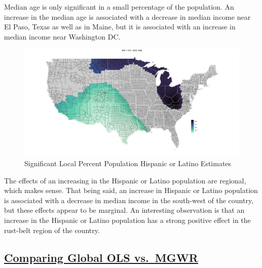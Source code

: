 \documentclass[
]{article}
\begin{document}
Median age is only significant in a small percentage of the population.
An increase in the median age is associated with a decrease in median
income near El Paso, Texas as well as in Maine, but it is associated
with an increase in median income near Washington DC.

\begin{figure}[H]

{\centering \includegraphics[width=1\linewidth]{images/local-param/sig-pct-hisplat} 

}

\caption{Significant Local Percent Population Hispanic or Latino Estimates}\label{fig:unnamed-chunk-19}
\end{figure}

The effects of an increasing in the Hispanic or Latino population are
regional, which makes sense. That being said, an increase in Hispanic or
Latino population is associated with a decrease in median income in the
south-west of the country, but these effects appear to be marginal. An
interesting observation is that an increase in the Hispanic or Latino
population has a strong positive effect in the rust-belt region of the
country.

\newpage

\subsection{\texorpdfstring{\ul{Comparing Global OLS
vs.~MGWR}}{Comparing Global OLS vs.~MGWR}}\label{comparing-global-ols-vs.-mgwr}
\end{document}
